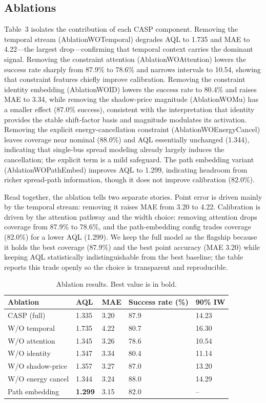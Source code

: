 \documentclass{article}
\begin{document}
\subsection{Ablations}
Table~3 isolates the contribution of each CASP component. Removing the temporal stream (AblationWOTemporal) degrades AQL to 1.735 and MAE to 4.22---the largest drop---confirming that temporal context carries the dominant signal. Removing the constraint attention (AblationWOAttention) lowers the success rate sharply from 87.9\% to 78.6\% and narrows intervals to 10.54, showing that constraint features chiefly improve calibration. Removing the constraint identity embedding (AblationWOID) lowers the success rate to 80.4\% and raises MAE to 3.34, while removing the shadow-price magnitude (AblationWOMu) has a smaller effect (87.0\% success), consistent with the interpretation that identity provides the stable shift-factor basis and magnitude modulates its activation. Removing the explicit energy-cancellation constraint (AblationWOEnergyCancel) leaves coverage near nominal (88.0\%) and AQL essentially unchanged (1.344), indicating that single-bus spread modeling already largely induces the cancellation; the explicit term is a mild safeguard. The path embedding variant (AblationWOPathEmbed) improves AQL to 1.299, indicating headroom from richer spread-path information, though it does not improve calibration (82.0\%).

Read together, the ablation tells two separate stories. Point error is driven mainly by the temporal stream: removing it raises MAE from 3.20 to 4.22. Calibration is driven by the attention pathway and the width choice: removing attention drops coverage from 87.9\% to 78.6\%, and the path-embedding config trades coverage (82.0\%) for a lower AQL (1.299). We keep the full model as the flagship because it holds the best coverage (87.9\%) and the best point accuracy (MAE 3.20) while keeping AQL statistically indistinguishable from the best baseline; the table reports this trade openly so the choice is transparent and reproducible.

\begin{table}[ht]
\centering
\caption{Ablation results. Best value is in bold.}
\label{tab:ablations}
\begin{tabular}{lllll}
\toprule
\textbf{Ablation} & \textbf{AQL} & \textbf{MAE} & \textbf{Success rate (\%)} & \textbf{90\% IW} \\
\midrule
CASP (full) & 1.335 & 3.20 & 87.9 & 14.23 \\
W/O temporal & 1.735 & 4.22 & 80.7 & 16.30 \\
W/O attention & 1.345 & 3.26 & 78.6 & 10.54 \\
W/O identity & 1.347 & 3.34 & 80.4 & 11.14 \\
W/O shadow-price & 1.357 & 3.27 & 87.0 & 13.20 \\
W/O energy cancel & 1.344 & 3.24 & 88.0 & 14.29 \\
Path embedding & \textbf{1.299} & 3.15 & 82.0 & -- \\
\bottomrule
\end{tabular}
\end{table}
\end{document}
